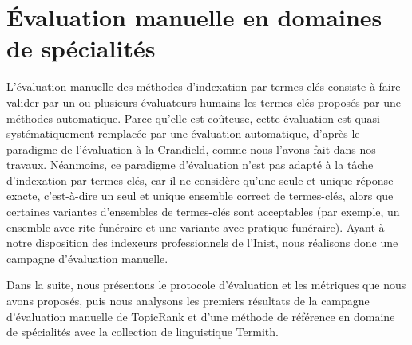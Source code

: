   \section{Évaluation manuelle en domaines de spécialités}
  \label{sec:main-domain_specific_keyphrase_annotation-manual_evaluation}
    L'évaluation manuelle des méthodes d'indexation par termes-clés consiste à
    faire valider par un ou plusieurs évaluateurs humains les termes-clés
    proposés par une méthodes automatique. Parce qu'elle est coûteuse, cette
    évaluation est quasi-systématiquement remplacée par une évaluation
    automatique, d'après le paradigme de l'évaluation \og{}à la Crandield\fg{},
    comme nous l'avons fait dans nos travaux. Néanmoins, ce paradigme
    d'évaluation n'est pas adapté à la tâche d'indexation par termes-clés, car
    il ne considère qu'une seule et unique réponse exacte, c'est-à-dire un seul
    et unique ensemble correct de termes-clés, alors que certaines variantes
    d'ensembles de termes-clés sont acceptables (par exemple, un ensemble avec
    \og{}rite funéraire\fg{} et une variante avec \og{}pratique funéraire\fg{}).
    Ayant à notre disposition des indexeurs professionnels de l'Inist, nous
    réalisons donc une campagne d'évaluation manuelle.

    Dans la suite, nous présentons le protocole d'évaluation et les métriques
    que nous avons proposés, puis nous analysons les premiers résultats de la
    campagne d'évaluation manuelle de TopicRank et d'une méthode de référence en
    domaine de spécialités avec la collection de linguistique Termith.

